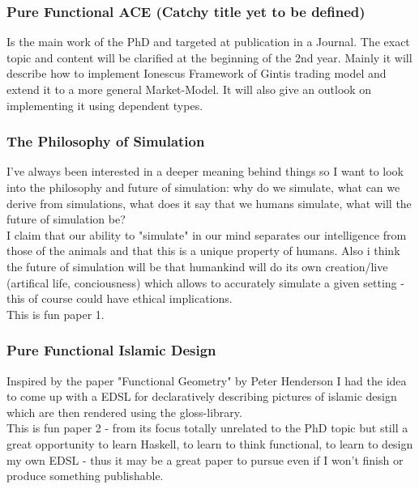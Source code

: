 \subsubsection{Pure Functional ACE (Catchy title yet to be defined)}
Is the main work of the PhD and targeted at publication in a Journal. The exact topic and content will be clarified at the beginning of the 2nd year. Mainly it will describe how to implement Ionescus Framework of Gintis trading model and extend it to a more general Market-Model. It will also give an outlook on implementing it using dependent types.

\subsubsection{The Philosophy of Simulation}
I've always been interested in a deeper meaning behind things so I want to look into the philosophy and future of simulation: why do we simulate, what can we derive from simulations, what does it say that we humans simulate, what will the future of simulation be? \\
I claim that our ability to "simulate" in our mind separates our intelligence from those of the animals and that this is a unique property of humans. Also i think the future of simulation will be that humankind will do its own creation/live (artifical life, conciousness) which allows to accurately simulate a given setting - this of course could have ethical implications. \\
This is fun paper 1.

\subsubsection{Pure Functional Islamic Design}
Inspired by the paper "Functional Geometry" by Peter Henderson I had the idea to come up with a  EDSL for declaratively describing pictures of islamic design which are then rendered using the gloss-library. \\
This is fun paper 2 - from its focus totally unrelated to the PhD topic but still a great opportunity to learn Haskell, to learn to think functional, to learn to design my own EDSL - thus it may be a great paper to pursue even if I won't finish or produce something publishable.